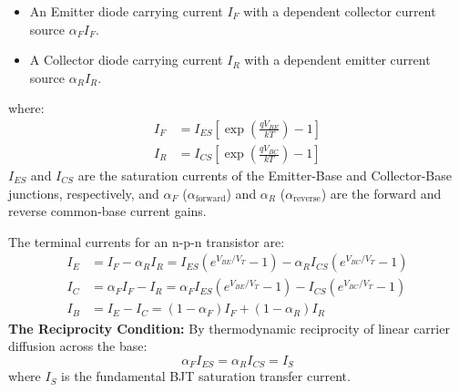 \documentclass[12pt,a4paper]{article}
\begin{document}
\begin{itemize}[leftmargin=*, itemsep=3pt]
  \item An Emitter diode carrying current $I_F$ with a dependent collector current source $\alpha_F I_F$.
  \item A Collector diode carrying current $I_R$ with a dependent emitter current source $\alpha_R I_R$.
\end{itemize}

where:
\begin{align}
  I_F &= I_{ES} \left[ \exp\left(\frac{q V_{BE}}{k T}\right) - 1 \right] \\
  I_R &= I_{CS} \left[ \exp\left(\frac{q V_{BC}}{k T}\right) - 1 \right]
\end{align}
$I_{ES}$ and $I_{CS}$ are the saturation currents of the Emitter-Base and Collector-Base junctions, respectively, and $\alpha_F$ ($\alpha_{\text{forward}}$) and $\alpha_R$ ($\alpha_{\text{reverse}}$) are the forward and reverse common-base current gains.

\begin{tcolorbox}[formulabox, title={\textbf{Ebers-Moll Equations}}]
The terminal currents for an n-p-n transistor are:
\begin{align}
  I_E &= I_F - \alpha_R I_R = I_{ES} \left( e^{V_{BE}/V_T} - 1 \right) - \alpha_R I_{CS} \left( e^{V_{BC}/V_T} - 1 \right) \\
  I_C &= \alpha_F I_F - I_R = \alpha_F I_{ES} \left( e^{V_{BE}/V_T} - 1 \right) - I_{CS} \left( e^{V_{BC}/V_T} - 1 \right) \\
  I_B &= I_E - I_C = (1 - \alpha_F) I_F + (1 - \alpha_R) I_R
\end{align}
\textbf{The Reciprocity Condition:} By thermodynamic reciprocity of linear carrier diffusion across the base:
\begin{equation}
  \alpha_F I_{ES} = \alpha_R I_{CS} = I_S
\end{equation}
where $I_S$ is the fundamental BJT saturation transfer current.
\end{tcolorbox}
\end{document}
